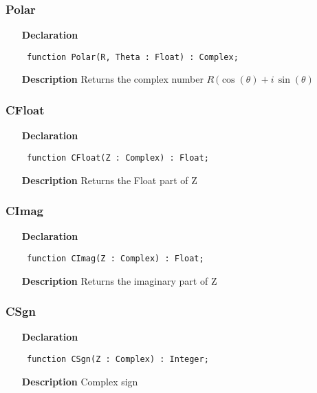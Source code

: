 \documentclass[12pt,a4paper,oneside]{report}
\newcommand{\declarationitem}[1]{\textbf{#1}}
\newcommand{\descriptiontitle}[1]{\textbf{#1}}
\newcommand{\code}[1]{\texttt{#1}}
\begin{document}
\subsubsection{Polar}
\label{ucomplex-Polar}
\begin{itemize}\item[\declarationitem{Declaration}\hfill]
\begin{flushleft}
\code{
function Polar(R, Theta : Float) : Complex;}
\end{flushleft}
\item[\descriptiontitle{Description}]
Returns the complex number
$R\,(\cos(\theta)+i\,\sin(\theta)$
\end{itemize}
\subsubsection{CFloat}
\label{ucomplex-CFloat}
\begin{itemize}\item[\declarationitem{Declaration}\hfill]
\begin{flushleft}
\code{
function CFloat(Z : Complex) : Float;}

\end{flushleft}

\par
\item[\descriptiontitle{Description}]
Returns the Float part of Z

\end{itemize}
\subsubsection{CImag}
\label{ucomplex-CImag}
\begin{itemize}\item[\declarationitem{Declaration}\hfill]
\begin{flushleft}
\code{
function CImag(Z : Complex) : Float;}

\end{flushleft}

\par
\item[\descriptiontitle{Description}]
Returns the imaginary part of Z

\end{itemize}
\subsubsection{CSgn}
\label{ucomplex-CSgn}
\begin{itemize}\item[\declarationitem{Declaration}\hfill]
\begin{flushleft}
\code{
function CSgn(Z : Complex) : Integer;}

\end{flushleft}

\par
\item[\descriptiontitle{Description}]
Complex sign

\end{itemize}
\end{document}
